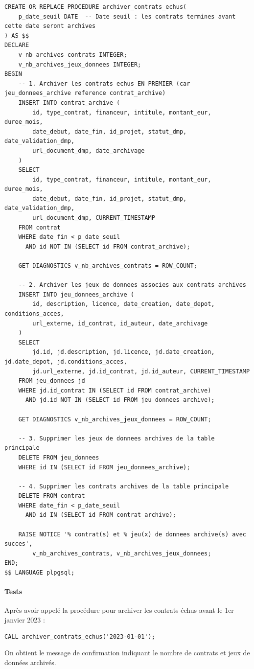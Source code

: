 \documentclass[12pt,a4paper]{article}
\begin{document}
\begin{lstlisting}[style=sqlstyle, caption=Procédure archivage\_contrats]
CREATE OR REPLACE PROCEDURE archiver_contrats_echus(
    p_date_seuil DATE  -- Date seuil : les contrats termines avant cette date seront archives
) AS $$
DECLARE
    v_nb_archives_contrats INTEGER;
    v_nb_archives_jeux_donnees INTEGER;
BEGIN
    -- 1. Archiver les contrats echus EN PREMIER (car jeu_donnees_archive reference contrat_archive)
    INSERT INTO contrat_archive (
        id, type_contrat, financeur, intitule, montant_eur, duree_mois,
        date_debut, date_fin, id_projet, statut_dmp, date_validation_dmp, 
        url_document_dmp, date_archivage
    )
    SELECT 
        id, type_contrat, financeur, intitule, montant_eur, duree_mois,
        date_debut, date_fin, id_projet, statut_dmp, date_validation_dmp, 
        url_document_dmp, CURRENT_TIMESTAMP
    FROM contrat
    WHERE date_fin < p_date_seuil
      AND id NOT IN (SELECT id FROM contrat_archive);
    
    GET DIAGNOSTICS v_nb_archives_contrats = ROW_COUNT;
    
    -- 2. Archiver les jeux de donnees associes aux contrats archives
    INSERT INTO jeu_donnees_archive (
        id, description, licence, date_creation, date_depot, conditions_acces, 
        url_externe, id_contrat, id_auteur, date_archivage
    )
    SELECT 
        jd.id, jd.description, jd.licence, jd.date_creation, jd.date_depot, jd.conditions_acces,
        jd.url_externe, jd.id_contrat, jd.id_auteur, CURRENT_TIMESTAMP
    FROM jeu_donnees jd
    WHERE jd.id_contrat IN (SELECT id FROM contrat_archive)
      AND jd.id NOT IN (SELECT id FROM jeu_donnees_archive);
    
    GET DIAGNOSTICS v_nb_archives_jeux_donnees = ROW_COUNT;
    
    -- 3. Supprimer les jeux de donnees archives de la table principale
    DELETE FROM jeu_donnees
    WHERE id IN (SELECT id FROM jeu_donnees_archive);
    
    -- 4. Supprimer les contrats archives de la table principale
    DELETE FROM contrat
    WHERE date_fin < p_date_seuil
      AND id IN (SELECT id FROM contrat_archive);
    
    RAISE NOTICE '% contrat(s) et % jeu(x) de donnees archive(s) avec succes', 
        v_nb_archives_contrats, v_nb_archives_jeux_donnees;
END;
$$ LANGUAGE plpgsql;
\end{lstlisting}

\paragraph{Tests}
Après avoir appelé la procédure pour archiver les contrats échus avant le 1er janvier 2023 :
\begin{lstlisting}[style=sqlstyle, caption=Test de la procédure archivage\_contrats]
CALL archiver_contrats_echus('2023-01-01');
\end{lstlisting}
On obtient le message de confirmation indiquant le nombre de contrats et jeux de données archivés.
\end{document}
